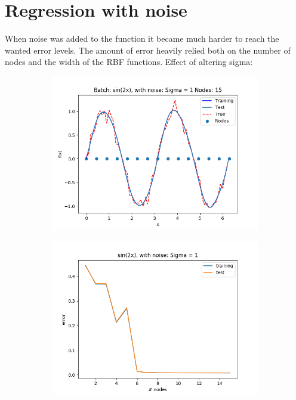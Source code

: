 \documentclass{article}
\begin{document}
\section{Regression with noise}
\FloatBarrier
When noise was added to the function it became much harder to reach the wanted error levels. The amount of error heavily relied both on the number of nodes and the width of the RBF functions.
Effect of altering sigma:
\FloatBarrier
\begin{figure}[ht!]
    \centering
    \begin{subfigure}[t]{0.4\textwidth}
        \centering
        \includegraphics[width=1\textwidth]{plots/noise/batch_sin2x_sigma1.png}
        \caption{}
    \end{subfigure}
    \begin{subfigure}[t]{0.4\textwidth}
        \centering
        \includegraphics[width=1\textwidth]{plots/noise/batch_sin2x_error_sigma1.png}

\end{subfigure}
\end{figure}
\end{document}
